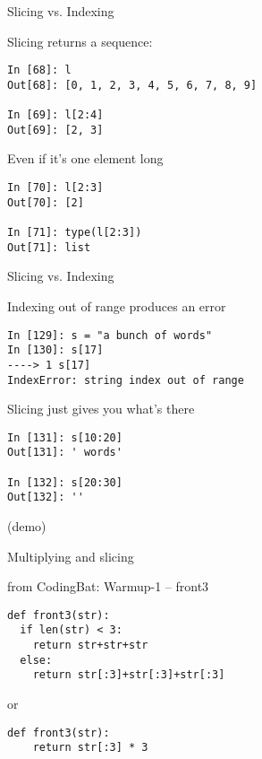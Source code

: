 \documentclass{beamer}
\begin{document}
\begin{frame}[fragile]{Slicing vs. Indexing}

Slicing returns a sequence:

\begin{verbatim}
In [68]: l
Out[68]: [0, 1, 2, 3, 4, 5, 6, 7, 8, 9]

In [69]: l[2:4]
Out[69]: [2, 3]
\end{verbatim}

Even if it's one element long

\begin{verbatim}
In [70]: l[2:3]
Out[70]: [2]

In [71]: type(l[2:3])
Out[71]: list
\end{verbatim}

\end{frame}

\begin{frame}[fragile]{Slicing vs. Indexing}

{\Large Indexing out of range produces an error}
\vfill
\begin{verbatim}
In [129]: s = "a bunch of words"
In [130]: s[17]
----> 1 s[17]
IndexError: string index out of range
\end{verbatim}

\vfill
{\Large Slicing just gives you what's there}

\begin{verbatim}
In [131]: s[10:20]
Out[131]: ' words'

In [132]: s[20:30]
Out[132]: ''
\end{verbatim}
(demo)
\end{frame}

\begin{frame}[fragile]{Multiplying and slicing}

{\Large from CodingBat: Warmup-1 -- front3}

\begin{verbatim}
def front3(str):
  if len(str) < 3:
    return str+str+str
  else:
    return str[:3]+str[:3]+str[:3]
\end{verbatim}

{\Large or}

\begin{verbatim}
def front3(str):
    return str[:3] * 3
\end{verbatim}

\end{frame} 
\end{document}
